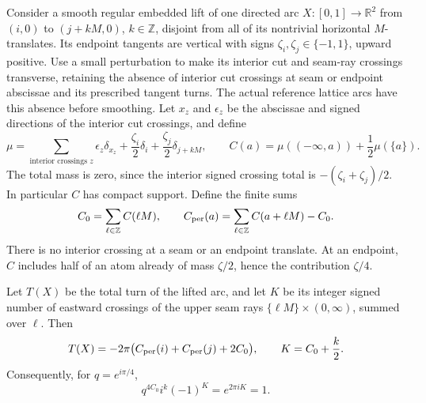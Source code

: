 Consider a smooth regular embedded lift of one directed arc
$X:[0,1]\to\mathbb R^2$ from $(i,0)$ to $(j+kM,0)$,
$k\in\mathbb Z$, disjoint from all of its nontrivial horizontal
$M$-translates. Its endpoint tangents are vertical with signs
$\zeta_i,\zeta_j\in\{-1,1\}$, upward positive. Use a small
perturbation to make its interior cut and seam-ray crossings
transverse, retaining the absence of interior cut crossings at
seam or endpoint abscissae and its prescribed tangent turns.
The actual reference lattice arcs have this absence before
smoothing. Let $x_z$ and $\epsilon_z$ be the abscissae and signed
directions of the interior cut crossings, and define
\[
 \mu=\sum_{\text{interior crossings }z}\epsilon_z\delta_{x_z}
       +\frac{\zeta_i}{2}\delta_i
       +\frac{\zeta_j}{2}\delta_{j+kM},\qquad
 C(a)=\mu((-\infty,a))+\frac12\mu(\{a\}).
\]
The total mass is zero, since the interior signed crossing total is
$-(\zeta_i+\zeta_j)/2$. In particular $C$ has compact support.
Define the finite sums
\[
 C_0=\sum_{\ell\in\mathbb Z}C(\ell M),\qquad
 C_{\rm per}(a)=\sum_{\ell\in\mathbb Z}C(a+\ell M)-C_0.
\]
There is no interior crossing at a seam or an endpoint translate.
At an endpoint, $C$ includes half of an atom already of mass
$\zeta/2$, hence the contribution $\zeta/4$.

\begin{lemma}\label{j:marked-phase}
Let $T(X)$ be the total turn of the lifted arc, and let $K$ be its
integer signed number of eastward crossings of the upper seam rays
$\{\ell M\}\times(0,\infty)$, summed over $\ell$. Then
\begin{equation}\label{j:marked-phase-identities}
 T(X)=-2\pi\bigl(C_{\rm per}(i)+C_{\rm per}(j)+2C_0\bigr),
 \qquad K=C_0+\frac{k}{2}.
\end{equation}
Consequently, for $q=e^{i\pi/4}$,
\[
 q^{4C_0}i^k(-1)^K=e^{2\pi iK}=1.
\]
\end{lemma}

